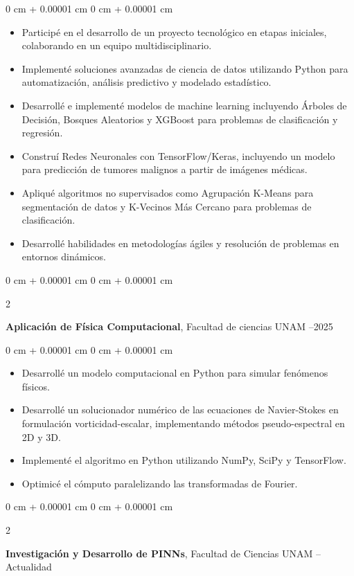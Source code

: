 \documentclass[10pt, letterpaper]{article}
\newenvironment{highlights}{
    \begin{itemize}[
        topsep=0.10 cm,
        parsep=0.10 cm,
        partopsep=0pt,
        itemsep=0pt,
        leftmargin=0 cm + 10pt
    ]
}{
    \end{itemize}
} %
\newenvironment{onecolentry}{
    \begin{adjustwidth}{
        0 cm + 0.00001 cm
    }{
        0 cm + 0.00001 cm
    }
}{
    \end{adjustwidth}
} %
\newenvironment{twocolentry}[2][]{
    \onecolentry
    \def\secondColumn{#2}
    \setcolumnwidth{\fill, 4.5 cm}
    \begin{paracol}{2}
}{
    \switchcolumn \raggedleft \secondColumn
    \end{paracol}
    \endonecolentry
} %
\begin{document}
        \vspace{0.10 cm}
        \begin{onecolentry}
            \begin{highlights}
                \item Participé en el desarrollo de un proyecto tecnológico en etapas iniciales, colaborando en un equipo multidisciplinario.
                \item Implementé soluciones avanzadas de ciencia de datos utilizando Python para automatización, análisis predictivo y modelado estadístico.
                \item Desarrollé e implementé modelos de machine learning incluyendo Árboles de Decisión, Bosques Aleatorios y XGBoost para problemas de clasificación y regresión.
                \item Construí Redes Neuronales con TensorFlow/Keras, incluyendo un modelo para predicción de tumores malignos a partir de imágenes médicas.
                \item Apliqué algoritmos no supervisados como Agrupación K-Means para segmentación de datos y K-Vecinos Más Cercano para problemas de clasificación.
                \item Desarrollé habilidades en metodologías ágiles y resolución de problemas en entornos dinámicos.
            \end{highlights}
        \end{onecolentry}

        \vspace{0.2 cm}

        \begin{twocolentry}{
            2023--2025
        }
            \textbf{Aplicación de Física Computacional}, Facultad de ciencias UNAM\end{twocolentry}

        \vspace{0.10 cm}
        \begin{onecolentry}
            \begin{highlights}
                \item Desarrollé un modelo computacional en Python para simular fenómenos físicos.
                \item Desarrollé un solucionador numérico de las ecuaciones de Navier-Stokes en formulación vorticidad-escalar, implementando métodos pseudo-espectral en 2D y 3D.
                \item Implementé el algoritmo en Python utilizando NumPy, SciPy y TensorFlow.
                \item Optimicé el cómputo paralelizando las transformadas de Fourier.
            \end{highlights}
        \end{onecolentry}
        \begin{twocolentry}{
            2025 -- Actualidad
        }
            \textbf{Investigación y Desarrollo de PINNs}, Facultad de Ciencias UNAM\end{twocolentry}
\end{document}
